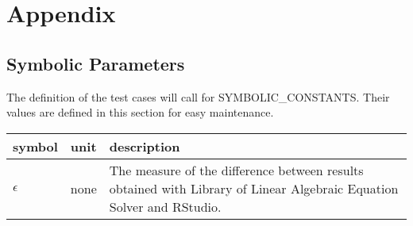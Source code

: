 \documentclass[12pt, titlepage]{article}
\begin{document}




\newpage

\section{Appendix}



\subsection{Symbolic Parameters}

The definition of the test cases will call for SYMBOLIC\_CONSTANTS.
Their values are defined in this section for easy maintenance.

\renewcommand{\arraystretch}{1.2}
\noindent \begin{longtable*}{l l p{12cm}} \toprule
\textbf{symbol} & \textbf{unit} & \textbf{description}\\
\midrule

$\epsilon$ & none & The measure of the difference between results obtained with
Library of Linear Algebraic Equation Solver and RStudio.\\

\bottomrule
\end{longtable*}
\end{document}
